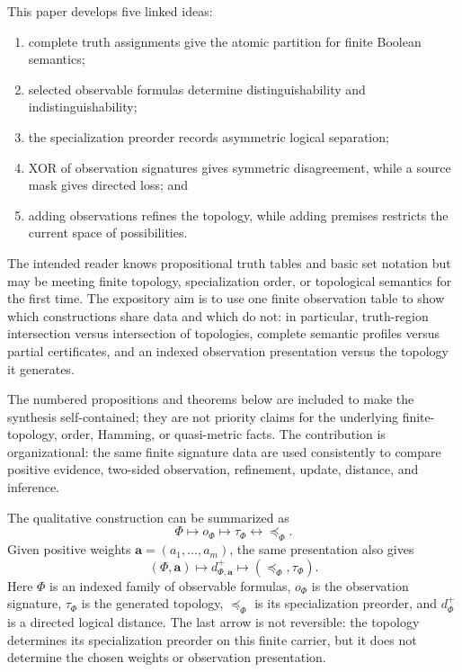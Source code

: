 \documentclass[11pt]{article}
\theoremstyle{definition}
\theoremstyle{plain}
\theoremstyle{remark}
\begin{document}
This paper develops five linked ideas:
\begin{enumerate}[label=(\roman*)]
\item complete truth assignments give the atomic partition for finite Boolean
      semantics;
\item selected observable formulas determine distinguishability and
      indistinguishability;
\item the specialization preorder records asymmetric logical separation;
\item XOR of observation signatures gives symmetric disagreement, while a
      source mask gives directed loss; and
\item adding observations refines the topology, while adding premises
      restricts the current space of possibilities.
\end{enumerate}

The intended reader knows propositional truth tables and basic set notation but
may be meeting finite topology, specialization order, or topological semantics
for the first time.  The expository aim is to use one finite observation table
to show which constructions share data and which do not: in particular,
truth-region intersection versus intersection of topologies, complete semantic
profiles versus partial certificates, and an indexed observation presentation
versus the topology it generates.

The numbered propositions and theorems below are included to make the synthesis
self-contained; they are not priority claims for the underlying finite-topology,
order, Hamming, or quasi-metric facts.  The contribution is organizational: the
same finite signature data are used consistently to compare positive evidence,
two-sided observation, refinement, update, distance, and inference.

The qualitative construction can be summarized as
\[
  \Phi\longmapsto o_\Phi\longmapsto\tau_\Phi
  \longleftrightarrow\preceq_\Phi.
\]
Given positive weights $\mathbf a=(a_1,\ldots,a_m)$, the same presentation also
gives
\[
  (\Phi,\mathbf a)\longmapsto d^+_{\Phi,\mathbf a}
  \longmapsto (\preceq_\Phi,\tau_\Phi).
\]
Here $\Phi$ is an indexed family of observable formulas, $o_\Phi$ is the observation
signature, $\tau_\Phi$ is the generated topology, $\preceq_\Phi$ is its
specialization preorder, and $d_\Phi^+$ is a directed logical distance.  The
last arrow is not reversible: the topology determines its specialization
preorder on this finite carrier, but it does not determine the chosen weights
or observation presentation.
\end{document}
